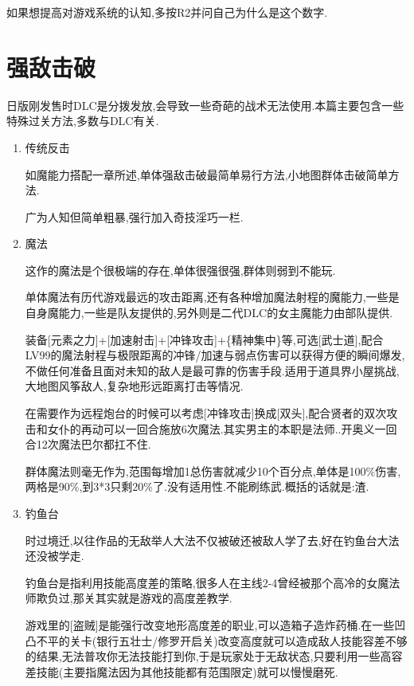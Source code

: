 	{\color{red}如果想提高对游戏系统的认知,多按R2并问自己为什么是这个数字.}

	\newpage

	\section{强敌击破}

	日版刚发售时DLC是分拨发放,会导致一些奇葩的战术无法使用.本篇主要包含一些特殊过关方法,多数与DLC有关.

	\begin{enumerate}

		\item{传统反击}

		如魔能力搭配一章所述,单体强敌击破最简单易行方法,小地图群体击破简单方法.

		广为人知但简单粗暴,强行加入奇技淫巧一栏.

		\item{魔法}

		这作的魔法是个很极端的存在,单体很强很强,群体则弱到不能玩.

		单体魔法有历代游戏最远的攻击距离,还有各种增加魔法射程的魔能力,一些是自身魔能力,一些是队友提供的,另外则是二代DLC的女主魔能力由部队提供.

		装备[元素之力]+[加速射击]+[冲锋攻击]+\{精神集中\}等,可选[武士道],配合LV99的魔法射程与极限距离的冲锋/加速与弱点伤害可以获得方便的瞬间爆发,不做任何准备且面对未知的敌人是最可靠的伤害手段.适用于道具界小屋挑战,大地图风筝敌人,复杂地形远距离打击等情况.


		在需要作为远程炮台的时候可以考虑[冲锋攻击]换成[双头],配合贤者的双次攻击和女仆的再动可以一回合施放6次魔法.其实男主的本职是法师..开奥义一回合12次魔法巴尔都扛不住.

		群体魔法则毫无作为,范围每增加1总伤害就减少10个百分点,单体是100\%伤害,两格是90\%,到3*3只剩20\%了.没有适用性.不能刷练武.概括的话就是:渣.

		\item{钓鱼台}

		时过境迁,以往作品的无敌举人大法不仅被破还被敌人学了去,好在钓鱼台大法还没被学走.

		钓鱼台是指利用技能高度差的策略,很多人在主线2-4曾经被那个高冷的女魔法师欺负过,那关其实就是游戏的高度差教学.

		游戏里的[盗贼]是能强行改变地形高度差的职业,可以造箱子造炸药桶.在一些凹凸不平的关卡(银行五壮士/修罗开启关)改变高度就可以造成敌人技能容差不够的结果,无法普攻你无法技能打到你,于是玩家处于无敌状态,只要利用一些高容差技能(主要指魔法因为其他技能都有范围限定)就可以慢慢磨死.


\end{enumerate}
